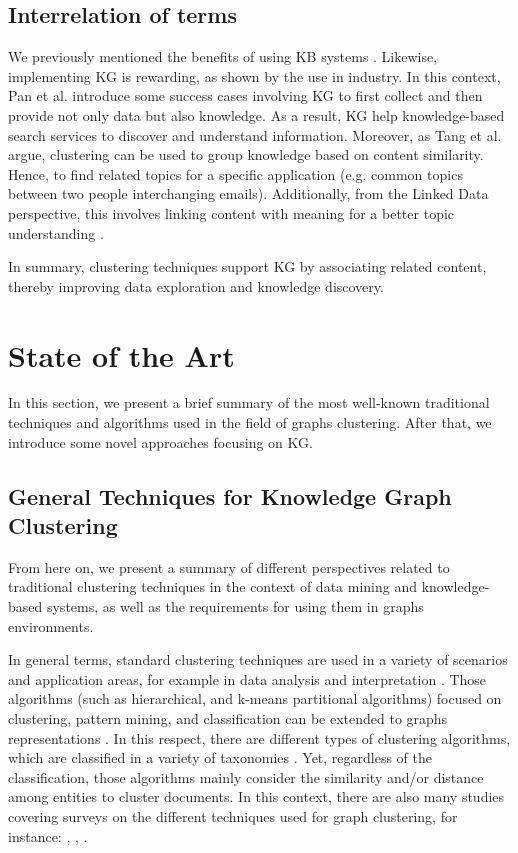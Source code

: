 \documentclass[runningheads]{llncs}
\begin{document}
\subsection{Interrelation of terms} \label{interrelation}
We previously mentioned the benefits of using KB systems \cite{Engelmore}. Likewise, implementing KG is 
rewarding, as shown by the use in industry. In this context, Pan et al. \cite{Pan} introduce some success cases involving KG to first collect and then provide not only data but also knowledge. As a result, KG help knowledge-based search services to discover and understand information. Moreover, as Tang et al. \cite{Tang} argue, clustering can be used to group knowledge based on content similarity. Hence, to find related topics for a specific application (e.g. common topics between two people interchanging emails). Additionally, from the Linked Data perspective, this involves linking content with meaning for a better topic understanding \cite{Pan}.

In summary, clustering techniques support KG by associating related content, thereby improving data exploration and knowledge discovery.


\section{State of the Art}\label{state-art}
In this section, we present a brief summary of the most well-known traditional techniques and algorithms used in the field of graphs clustering. After that, we introduce some novel approaches focusing on KG. 

\subsection{General Techniques for Knowledge Graph Clustering} \label{general-techniques}
From here on, we present a summary of different perspectives related to traditional clustering techniques in the context of data mining and knowledge-based systems, as well as the requirements for using them in graphs environments.

In general terms, standard clustering techniques are used in a variety of scenarios and application areas, for example in data analysis and interpretation \cite{Pedrycz}. Those algorithms (such as hierarchical, and k-means partitional algorithms) focused on clustering, pattern mining, and classification can be extended to graphs representations \cite{Aggarwal}. In this respect, there are different types of clustering algorithms, which are classified in a variety of taxonomies \cite{Zacharski} \cite{Pedrycz} \cite{Berkhin}. Yet, regardless of the classification, those algorithms mainly consider the similarity and/or distance among entities \cite{Pedrycz} to cluster documents. In this context, there are also many studies covering surveys on the different techniques used for graph clustering, for instance: \cite{Schaeffer}, \cite{Aggarwal}, \cite{Carpineto}. 
\end{document}
